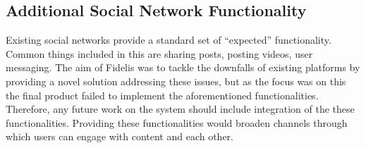 \subsection{Additional Social Network Functionality}
Existing social networks provide a standard set of ``expected'' functionality. Common things included in this are sharing posts, posting videos, user messaging. The aim of Fidelis was to tackle the downfalls of existing platforms by providing a novel solution addressing these issues, but as the focus was on this the final product failed to implement the aforementioned functionalities. Therefore, any future work on the system should include integration of the these functionalities. Providing these functionalities would broaden channels through which users can engage with content and each other.